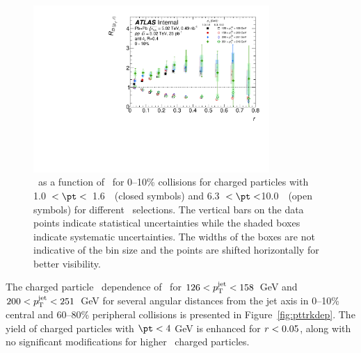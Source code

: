 \begin{figure}[ht]
\centerline{
\includegraphics[width=0.8\textwidth]{figures/results/RDpT_dR_trk2_trk6_cent0.pdf} 
}
\caption{\RDptr\ as a function of \rvar\ for 0--10\% collisions for charged particles with 1.0~$< \pt <$~1.6~\GeV\
(closed symbols) and 6.3~$< \pt <$10.0~\GeV\ (open symbols) for different \ptjet\ selections. The vertical bars on the data points indicate statistical uncertainties while the shaded boxes indicate systematic uncertainties. The widths of the boxes are not indicative of the bin size and the points are shifted horizontally for better visibility.}
\label{fig:ptjetdep}
\end{figure}


The charged particle \pt\ dependence of \RDptr\ for \mbox{$126 < \mbox{$p_{\mathrm{T}}^{\mathrm{jet}}$} < 158$ GeV} and \mbox{$200 < \mbox{$p_{\mathrm{T}}^{\mathrm{jet}}$} < 251$ GeV} for several angular distances from the jet axis in 0--10\% central and 60--80\% peripheral collisions is presented in Figure~\ref{fig:pttrkdep}. The yield of charged particles with $\pt < 4$ GeV is enhanced for $\mbox{$r$} < 0.05$, along with no significant modifications for higher \pt\ charged particles. 

